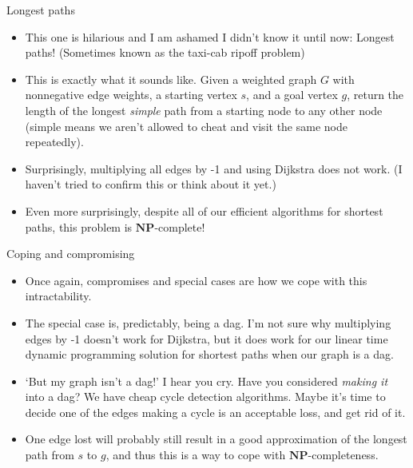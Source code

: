 \documentclass{beamer}
\begin{document}
\begin{frame}{Longest paths}
    \begin{itemize}
        \item This one is hilarious and I am ashamed I didn't know it until now: Longest paths! (Sometimes known as the taxi-cab ripoff problem) \pause 
        \item This is exactly what it sounds like. Given a weighted graph $G$ with nonnegative edge weights, a starting vertex $s$, and a goal vertex $g$, return the length of the longest \emph{simple} path from a starting node to any other node (simple means we aren't allowed to cheat and visit the same node repeatedly). \pause
        \item Surprisingly, multiplying all edges by -1 and using Dijkstra does not work. (I haven't tried to confirm this or think about it yet.) \pause 
        \item Even more surprisingly, despite all of our efficient algorithms for shortest paths, this problem is $\mathbf{NP}$-complete! \pause 
    \end{itemize}
\end{frame}

\begin{frame}{Coping and compromising}
    \begin{itemize}
        \item Once again, compromises and special cases are how we cope with this intractability. \pause 
        \item The special case is, predictably, being a dag. I'm not sure why multiplying edges by -1 doesn't work for Dijkstra, but it does work for our linear time dynamic programming solution for shortest paths when our graph is a dag. \pause 
        \item `But my graph isn't a dag!' I hear you cry. Have you considered \emph{making it} into a dag? We have cheap cycle detection algorithms. Maybe it's time to decide one of the edges making a cycle is an acceptable loss, and get rid of it. \pause 
        \item One edge lost will probably still result in a good approximation of the longest path from $s$ to $g$, and thus this is a way to cope with $\mathbf{NP}$-completeness.
    \end{itemize}
\end{frame}
\end{document}
